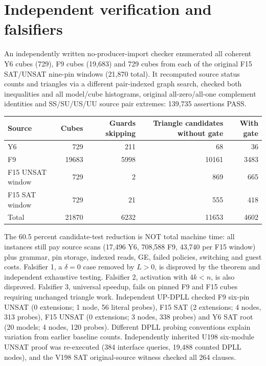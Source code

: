 \documentclass[11pt]{article}
\begin{document}
\section{Independent verification and falsifiers}
An independently written no-producer-import checker enumerated all coherent Y6 cubes (729), F9 cubes (19,683) and 729 cubes from each of the original F15 SAT/UNSAT nine-pin windows (21,870 total). It recomputed source status counts and triangles via a different pair-indexed graph search, checked both inequalities and all model/cube histograms, original all-zero/all-one complement identities and SS/SU/US/UU source pair extremes: 139,735 assertions PASS.
\begin{center}\begin{tabular}{lrrrr}
\toprule Source & Cubes & Guards skipping & Triangle candidates without gate & With gate\\\midrule
Y6&729&211&68&36\\
F9&19683&5998&10161&3483\\
F15 UNSAT window&729&2&869&665\\
F15 SAT window&729&21&555&418\\\midrule
Total&21870&6232&11653&4602\\\bottomrule
\end{tabular}\end{center}
The 60.5 percent candidate-test reduction is NOT total machine time: all instances still pay source scans (17,496 Y6, 708,588 F9, 43,740 per F15 window) plus grammar, pin storage, indexed reads, GE, failed policies, switching and guest costs. Falsifier 1, a $\delta=0$ case removed by $L>0$, is disproved by the theorem and independent exhaustive testing. Falsifier 2, activation with $4k<n$, is also disproved. Falsifier 3, universal speedup, fails on pinned F9 and F15 cubes requiring unchanged triangle work. Independent UP-DPLL checked F9 six-pin UNSAT (0 extensions; 1 node, 56 literal probes), F15 SAT (2 extensions; 4 nodes, 313 probes), F15 UNSAT (0 extensions; 3 nodes, 338 probes) and Y6 SAT root (20 models; 4 nodes, 120 probes). Different DPLL probing conventions explain variation from earlier baseline counts. Independently inherited U198 six-module UNSAT proof was re-executed (384 interface queries, 19,488 counted DPLL nodes), and the V198 SAT original-source witness checked all 264 clauses.
\end{document}
